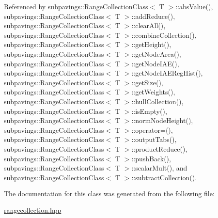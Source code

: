 \-Referenced by subpavings\-::\-Range\-Collection\-Class$<$ T $>$\-::abs\-Value(), subpavings\-::\-Range\-Collection\-Class$<$ T $>$\-::add\-Reduce(), subpavings\-::\-Range\-Collection\-Class$<$ T $>$\-::clear\-All(), subpavings\-::\-Range\-Collection\-Class$<$ T $>$\-::combine\-Collection(), subpavings\-::\-Range\-Collection\-Class$<$ T $>$\-::get\-Height(), subpavings\-::\-Range\-Collection\-Class$<$ T $>$\-::get\-Node\-Area(), subpavings\-::\-Range\-Collection\-Class$<$ T $>$\-::get\-Node\-I\-A\-E(), subpavings\-::\-Range\-Collection\-Class$<$ T $>$\-::get\-Node\-I\-A\-E\-Reg\-Hist(), subpavings\-::\-Range\-Collection\-Class$<$ T $>$\-::get\-Size(), subpavings\-::\-Range\-Collection\-Class$<$ T $>$\-::get\-Weights(), subpavings\-::\-Range\-Collection\-Class$<$ T $>$\-::hull\-Collection(), subpavings\-::\-Range\-Collection\-Class$<$ T $>$\-::is\-Empty(), subpavings\-::\-Range\-Collection\-Class$<$ T $>$\-::norm\-Node\-Height(), subpavings\-::\-Range\-Collection\-Class$<$ T $>$\-::operator=(), subpavings\-::\-Range\-Collection\-Class$<$ T $>$\-::output\-Tabs(), subpavings\-::\-Range\-Collection\-Class$<$ T $>$\-::product\-Reduce(), subpavings\-::\-Range\-Collection\-Class$<$ T $>$\-::push\-Back(), subpavings\-::\-Range\-Collection\-Class$<$ T $>$\-::scalar\-Mult(), and subpavings\-::\-Range\-Collection\-Class$<$ T $>$\-::subtract\-Collection().



\-The documentation for this class was generated from the following file\-:\begin{DoxyCompactItemize}
\item 
\hyperlink{rangecollection_8hpp}{rangecollection.\-hpp}\end{DoxyCompactItemize}
